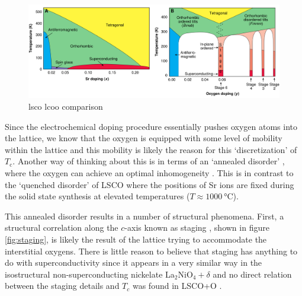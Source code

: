 \begin{figure}
    \centering
    \includegraphics[width=\textwidth]{fig/intro/phases_wells.png}
    \caption[lsco lcoo comparison]{lsco lcoo comparison \cite{Wells1997}}
    \label{fig:phase_wells}
\end{figure}

Since the electrochemical doping procedure essentially pushes oxygen atoms into the lattice, we know that the oxygen is equipped with some level of mobility within the lattice and this mobility is likely the reason for this `discretization' of $T_\text{c}$. Another way of thinking about this is in terms of an `annealed disorder' \cite{Wells1997}, where the oxygen can achieve an optimal inhomogeneity \cite{Poccia2012}. This is in contrast to the `quenched disorder' \cite{Wells1997} of LSCO where the positions of Sr ions are fixed during the solid state synthesis at elevated temperatures ($T \approx \SI{1000}{\celsius}$). 

This annealed disorder results in a number of structural phenomena. First, a structural correlation along the $c$-axis known as staging \cite{Wells1996}, shown in figure \ref{fig:staging}, is likely the result of the lattice trying to accommodate the interstitial oxygens. There is little reason to believe that staging has anything to do with superconductivity since it appears in a very similar way in the isostructural non-superconducting nickelate La$_2$NiO$_4+\delta$ \cite{Tranquada1994} and no direct relation between the staging details and $T_c$ was found in LSCO+O \cite{Ray2017}.

